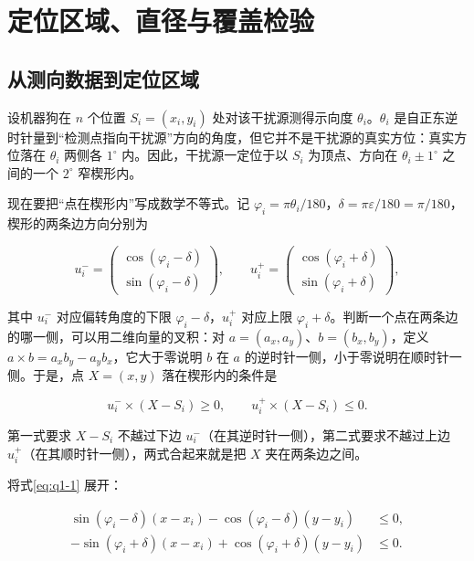 \section{定位区域、直径与覆盖检验}\label{sec:q1}
\subsection{从测向数据到定位区域}\label{sec:q1-1}

设机器狗在 $n$ 个位置 $S_i=(x_i,y_i)$ 处对该干扰源测得示向度 $\theta_i$。$\theta_i$ 是自正东逆时针量到“检测点指向干扰源”方向的角度，但它并不是干扰源的真实方位：真实方位落在 $\theta_i$ 两侧各 $1^\circ$ 内。因此，干扰源一定位于以 $S_i$ 为顶点、方向在 $\theta_i\pm1^\circ$ 之间的一个 $2^\circ$ 窄楔形内。

现在要把“点在楔形内”写成数学不等式。记 $\varphi_i=\pi\theta_i/180$，$\delta=\pi\varepsilon/180=\pi/180$，楔形的两条边方向分别为

\[
u_i^-=\begin{pmatrix}\cos(\varphi_i-\delta)\\ \sin(\varphi_i-\delta)\end{pmatrix},\qquad
u_i^+=\begin{pmatrix}\cos(\varphi_i+\delta)\\ \sin(\varphi_i+\delta)\end{pmatrix},
\]

其中 $u_i^-$ 对应偏转角度的下限 $\varphi_i-\delta$，$u_i^+$ 对应上限 $\varphi_i+\delta$。判断一个点在两条边的哪一侧，可以用二维向量的叉积：对 $a=(a_x,a_y)$、$b=(b_x,b_y)$，定义 $a\times b=a_xb_y-a_yb_x$，它大于零说明 $b$ 在 $a$ 的逆时针一侧，小于零说明在顺时针一侧。于是，点 $X=(x,y)$ 落在楔形内的条件是

\begin{equation}\label{eq:q1-1}
u_i^-\times(X-S_i)\ge 0,\qquad u_i^+\times(X-S_i)\le 0.
\end{equation}

第一式要求 $X-S_i$ 不越过下边 $u_i^-$（在其逆时针一侧），第二式要求不越过上边 $u_i^+$（在其顺时针一侧），两式合起来就是把 $X$ 夹在两条边之间。

将式\eqref{eq:q1-1} 展开：

\begin{equation}\label{eq:q1-2}
\begin{aligned}
\sin(\varphi_i-\delta)(x-x_i)-\cos(\varphi_i-\delta)(y-y_i)&\le 0,\\
-\sin(\varphi_i+\delta)(x-x_i)+\cos(\varphi_i+\delta)(y-y_i)&\le 0.
\end{aligned}
\end{equation}

